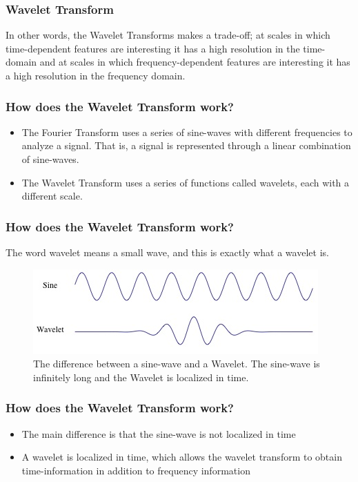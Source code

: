\documentclass{beamer}
\begin{document}
\begin{frame}
	\frametitle{Wavelet Transform}
	
	In other words, the Wavelet Transforms makes a trade-off; at scales in which time-dependent features are interesting it has a high resolution in the time-domain and at scales in which frequency-dependent features are interesting it has a high resolution in the frequency domain.
	
	
	
\end{frame}

\begin{frame}
	\frametitle{How does the Wavelet Transform work?}
	\begin{itemize}
		\item
		The Fourier Transform uses a series of sine-waves with different frequencies to analyze a signal. That is, a signal is represented through a linear combination of sine-waves.
		
		\item
		
		The Wavelet Transform uses a series of functions called wavelets, each with a different scale.
		
	\end{itemize}
	
\end{frame}


\begin{frame}
	\frametitle{How does the Wavelet Transform work?}
	The word wavelet means a small wave, and this is exactly what a wavelet is.
	\begin{center}
		\begin{figure}
			\includegraphics[scale=0.5]{Wavelet-Out1.jpg}
			\caption{ The difference between a sine-wave and a Wavelet. The sine-wave is infinitely long and the Wavelet is localized in time.}
		\end{figure}
	\end{center}
	
\end{frame}

\begin{frame}
	\frametitle{How does the Wavelet Transform work?}
	
	\begin{itemize}
		\item
		 The main difference is that the sine-wave is not localized in time
		
		\item
		
		A wavelet is localized in time, which allows the wavelet transform to obtain time-information in addition to frequency information
		
	\end{itemize}

\end{frame}
\end{document}
